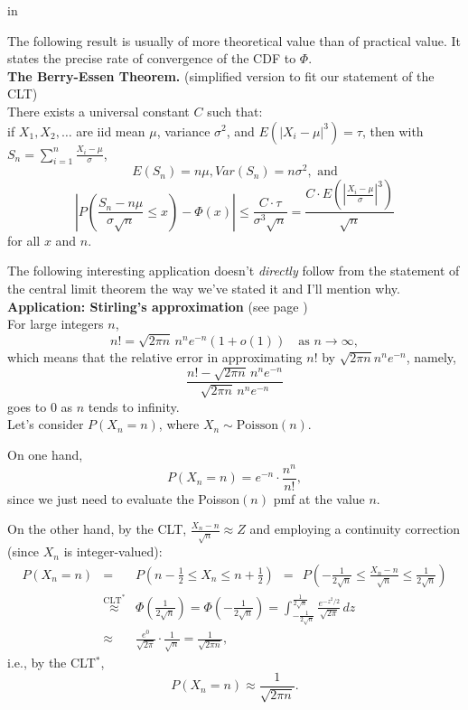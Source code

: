 \documentclass[12pt]{article}
\begin{document}
 in

\noindent The following result is usually of more theoretical value than of practical value.  It states the precise rate of convergence of the CDF to $\Phi$.\\

\noindent \textbf{The Berry-Essen Theorem.} \label{berryesseen}(simplified version to fit our statement of the CLT) \\
There exists a universal constant $C$ such that:\\
if $X_1, X_2, \dots$ are iid mean $\mu$, variance $\sigma^2$, and $E(|X_i - \mu|^3) = \tau$, then with $S_n = \sum_{i=1}^n \frac{X_i - \mu}{\sigma}$,
$$E(S_n) = n\mu, Var(S_n) = n\sigma^2, \text{ and}$$
$$
\left| P\left( \frac{S_n - n\mu}{\sigma\sqrt{n}} \leq x \right) - \Phi(x)\right| \leq \frac{C \cdot \tau}{\sigma^3 \sqrt{n}} = \frac{C \cdot E\left(\left|\frac{X_i - \mu}{\sigma}\right|^3\right)}{\sqrt{n}}
$$
for all $x$ and $n$.\\





\newpage

\noindent The following interesting application doesn't {\em directly} follow from the statement of the central limit theorem the way we've stated it and I'll mention why.\\

\noindent \textbf{Application: Stirling's approximation} (see page \pageref{stirling})\\
For large integers $n$,
$$n! = \sqrt{2\pi n}\,n^ne^{-n}(1+o(1))\quad \mbox{as }n\to \infty,$$
which means that the relative error in approximating $n!$ by
$\sqrt{2\pi n}n^ne^{-n}$, namely,
$$\frac {n! - \sqrt{2\pi n}\,n^ne^{-n}}{\sqrt{2\pi n}\,n^ne^{-n}}$$
goes to 0 as $n$ tends to infinity.\\

\noindent Let's consider $P(X_n=n)$, where $X_n\sim \mbox{Poisson}(n)$.

On one hand,
\begin{equation}\label{exactpoissonvalue}P(X_n=n) = e^{-n}\cdot \frac {n^n}{n!},\end{equation}
since we just need to evaluate the Poisson$(n)$ pmf at the value $n$.

On the other hand, by the CLT, $\frac {X_n-n}{\sqrt{n}}\approx Z$ and employing a continuity correction (since $X_n$ is integer-valued):
\begin{eqnarray*}
P(X_n=n) & = & P(n-\frac 12 \le X_n \le n+\frac 12) \ \  = \ \  P(-\frac 1{2\sqrt{n}} \le \frac {X_n-n}{\sqrt{n}} \le \frac 1{2\sqrt{n}}) \\
& \stackrel{\text{CLT}^*}{\approx } & \Phi(\frac 1{2\sqrt{n}}) = \Phi(-\frac 1{2\sqrt{n}}) = \int_{-\frac 1{2\sqrt{n}}}^{\frac 1{2\sqrt{n}}} \frac {e^{-z^2/2}}{\sqrt{2\pi}}\,dz\\
& \approx &  \frac{e^0}{\sqrt{2\pi}} \cdot \frac{1}{\sqrt{n}} = \frac 1{\sqrt{2\pi n}},
\end{eqnarray*}
i.e., by the CLT$^*$,
\begin{equation}\label{approxpoissonvalue} P(X_n=n)\approx \frac 1{\sqrt{2\pi n}}.\end{equation}
\end{document}
